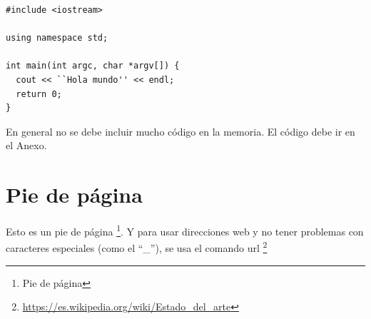 \lstset{numbers=left,numberstyle=\tiny, language=C, breaklines=true, basicstyle=\footnotesize, xleftmargin=25pt, framesep=8pt, numbersep=15pt}


\begin{lstlisting}[frame=leftline, caption={Hola Mundo}, label=code:prog1]
#include <iostream> 

using namespace std;

int main(int argc, char *argv[]) {
  cout << ``Hola mundo'' << endl;
  return 0;
}
\end{lstlisting}


En general no se debe incluir mucho código en la memoria. El código debe ir en el Anexo. 

\section{Pie de página}

Esto es un pie de página \footnote{Pie de página}. Y para usar direcciones web y no tener problemas con caracteres especiales (como el ``\_''), se usa el comando url \footnote{\url{https://es.wikipedia.org/wiki/Estado_del_arte}}



